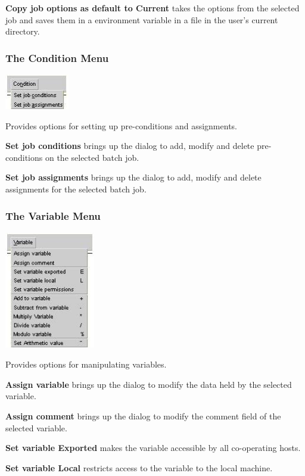 \textbf{Copy job options as default to Current} takes the options from
the selected job and saves them in a 
environment variable in a \configurationfile{} file in the
user's current directory.

\subsubsection{The Condition Menu}
 \includegraphics[width=2.798cm,height=1.535cm]{img/ref20.jpg} 

Provides options for setting up pre-conditions and assignments.

\textbf{Set job conditions} brings up the dialog to add, modify and
delete pre-conditions on the selected batch job.

\textbf{Set job assignments} brings up the dialog to add, modify and
delete assignments for the selected batch job.

\subsubsection{The Variable Menu}
 \includegraphics[width=3.955cm,height=5.129cm]{img/ref21.jpg} 

Provides options for manipulating variables.

\textbf{Assign variable} brings up the dialog to modify the data held by
the selected variable.

\textbf{Assign comment} brings up the dialog to modify the comment field
of the selected variable.

\textbf{Set variable Exported} makes the variable accessible by all
co-operating \ProductName{} hosts.

\textbf{Set variable Local} restricts access to the variable to the
local machine.

